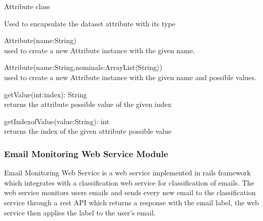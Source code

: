 \begin{my_itemize}
  \item Attribute class
  \begin{my_desc}
    \item[Purpose] Used to encapsulate the dataset attribute with its type
    \item[Functions] \hfill
    \begin{my_itemize}
      \item Attribute(name:String) \\
      used to create a new Attribute instance with the given name.
      \item Attribute(name:String,nominals:ArrayList$\langle$String$\rangle$) \\
      used to create a new Attribute instance with the given name and possible values.
      \item getValue(int:index): String \\
      returns the attribute possible value of the given index
      \item getIndexofValue(value:String): int \\
      returns the index of the given attribute possible value
    \end{my_itemize}

  \end{my_desc}

\end{my_itemize}

\subsubsection{Email Monitoring Web Service Module}

Email Monitoring Web Service is a web service implemented in rails framework which integrates 
with a classification web service for classification of emails. The web service monitors 
users emails and sends every new email to the classification service through a rest API 
which returns a response with the email label, the web service then applies  the label to the user’s email.

